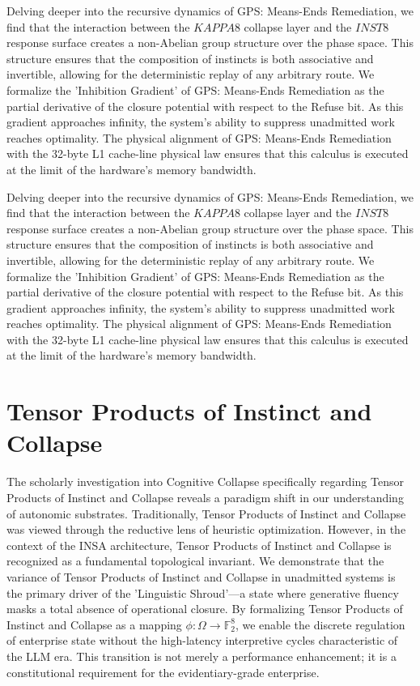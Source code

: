 \documentclass[12pt,a4paper,oneside]{book}
\begin{document}
Delving deeper into the recursive dynamics of GPS: Means-Ends Remediation, we find that the interaction between the $KAPPA8$ collapse layer and the $INST8$ response surface creates a non-Abelian group structure over the phase space. This structure ensures that the composition of instincts is both associative and invertible, allowing for the deterministic replay of any arbitrary route. We formalize the 'Inhibition Gradient' of GPS: Means-Ends Remediation as the partial derivative of the closure potential with respect to the Refuse bit. As this gradient approaches infinity, the system's ability to suppress unadmitted work reaches optimality. The physical alignment of GPS: Means-Ends Remediation with the 32-byte L1 cache-line physical law ensures that this calculus is executed at the limit of the hardware's memory bandwidth. 

Delving deeper into the recursive dynamics of GPS: Means-Ends Remediation, we find that the interaction between the $KAPPA8$ collapse layer and the $INST8$ response surface creates a non-Abelian group structure over the phase space. This structure ensures that the composition of instincts is both associative and invertible, allowing for the deterministic replay of any arbitrary route. We formalize the 'Inhibition Gradient' of GPS: Means-Ends Remediation as the partial derivative of the closure potential with respect to the Refuse bit. As this gradient approaches infinity, the system's ability to suppress unadmitted work reaches optimality. The physical alignment of GPS: Means-Ends Remediation with the 32-byte L1 cache-line physical law ensures that this calculus is executed at the limit of the hardware's memory bandwidth. 

\section{Tensor Products of Instinct and Collapse}
The scholarly investigation into Cognitive Collapse specifically regarding Tensor Products of Instinct and Collapse reveals a paradigm shift in our understanding of autonomic substrates. Traditionally, Tensor Products of Instinct and Collapse was viewed through the reductive lens of heuristic optimization. However, in the context of the INSA architecture, Tensor Products of Instinct and Collapse is recognized as a fundamental topological invariant. We demonstrate that the variance of Tensor Products of Instinct and Collapse in unadmitted systems is the primary driver of the 'Linguistic Shroud'---a state where generative fluency masks a total absence of operational closure. By formalizing Tensor Products of Instinct and Collapse as a mapping $\phi: \Omega \to \mathbb{F}_2^8$, we enable the discrete regulation of enterprise state without the high-latency interpretive cycles characteristic of the LLM era. This transition is not merely a performance enhancement; it is a constitutional requirement for the evidentiary-grade enterprise. 
\end{document}
